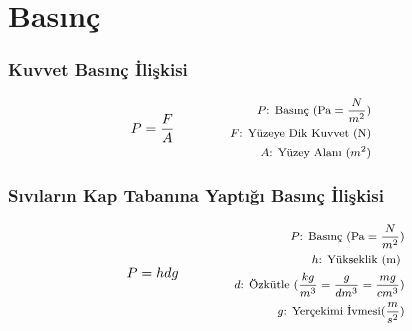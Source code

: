 \section{Basınç}

\subsubsection*{Kuvvet Basınç İlişkisi}
\begin{equation}
    P = \frac{F}{A} \qquad \qquad \parbox{4cm}{\footnotesize$\begin{aligned}
        P\text{: Basınç (Pa} = \frac{N}{m^2}\text{)} \\ 
        F\text{: Yüzeye Dik Kuvvet (N)} \\
        A\text{: Yüzey Alanı } (m^2)
\end{aligned}$}
\end{equation}

\subsubsection*{Sıvıların Kap Tabanına Yaptığı Basınç İlişkisi}
\begin{equation}
    P = hdg \qquad \qquad \parbox{4cm}{\footnotesize$\begin{aligned}
        P\text{: Basınç (Pa} = \frac{N}{m^2}\text{)} \\ 
        h\text{: Yükseklik (m) } \\
        d\text{: Özkütle } (\frac{kg}{m^3} = \frac{g}{dm^3} = \frac{mg}{cm^3})  \\
        g\text{: Yerçekimi İvmesi} (\frac{m}{s^2})
\end{aligned}$}
\end{equation}